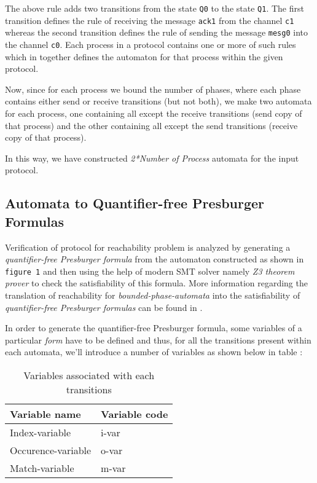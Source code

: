 The above rule adds two transitions from the state {\tt Q0} to the state {\tt Q1}.
The first transition defines the rule of receiving the message {\tt ack1} from the channel {\tt c1} 
whereas the second transition defines the rule of sending the message {\tt mesg0} into the channel {\tt c0}.
Each process in a protocol contains one or more of  such rules which in together defines the automaton for that 
process within the given protocol.


Now, since  for each process  we bound  the number of  phases, where  each phase contains either send or 
receive transitions (but not both), we make two automata for each process, one containing all 
except the receive transitions (send copy of that process) and the other containing all except the send 
transitions (receive copy of that process).


In this way, we have constructed \emph{2*Number of Process} automata for the input protocol.


\subsection{Automata to Quantifier-free Presburger Formulas}
Verification of protocol for reachability problem is analyzed by generating a  \emph{quantifier-free Presburger formula} from the automaton 
constructed as shown in {\tt figure 1} and then using the help of modern SMT solver namely \emph{Z3 theorem prover} to check the satisfiability of this formula. 
More information  regarding the  translation of reachability for \emph{bounded-phase-automata} 
into the satisfiability of \emph{quantifier-free Presburger formulas} can be found in \cite{AAC13}.


In order to generate the quantifier-free Presburger formula,  some variables of a particular \emph{form} have to be 
defined and thus, for all the transitions present within each automata, we'll introduce a number of variables as shown below in table :
\begin{table}[ht]
  \begin{center}
    \begin{tabular}{|l|l|}
      \hline
      Variable name & Variable code\\
      \hline
      Index-variable & i-var\\
      Occurence-variable & o-var\\
      Match-variable & m-var\\
      \hline
    \end{tabular}
  \end{center}
  \caption{Variables associated with each transitions}\label{tbl:variables}
\end{table}


